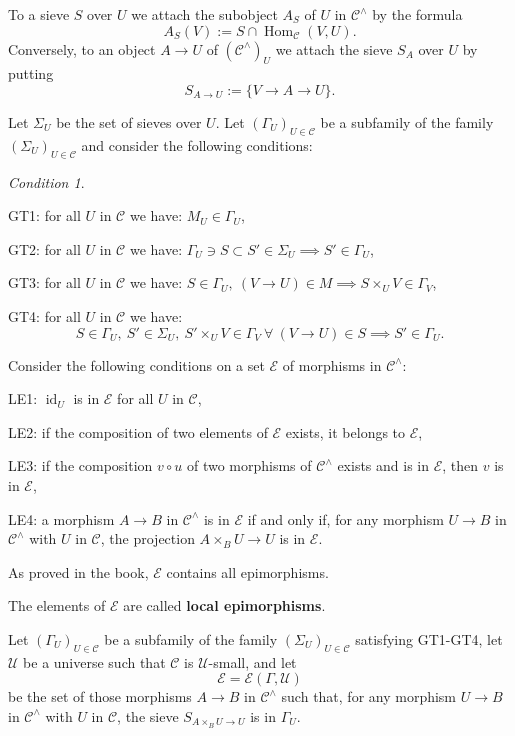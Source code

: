 \documentclass[12pt]{article}
\theoremstyle{remark}
\newtheorem{cond}[thm]{Condition}
\theoremstyle{definition}
\newcommand{\nn}{\noindent}
\newcommand{\cc}{\mathcal}
\newcommand{\C}{\mathcal C}
\newcommand{\U}{\mathcal U}
\DeclareMathOperator{\id}{id}
\DeclareMathOperator{\Hom}{Hom}
\begin{document}
To a sieve $S$ over $U$ we attach the subobject $A_S$ of $U$ in $\C^\wedge$ by the formula
$$
A_S(V):=S\cap\Hom_\C(V,U).
$$ 
Conversely, to an object $A\to U$ of $(\C^\wedge)_U$ we attach the sieve $S_A$ over $U$ by putting 
$$
S_{A\to U}:=\{V\to A\to U\}.
$$ 

Let $\Sigma_U$ be the set of sieves over $U$. Let $(\Gamma_U)_{U\in\C}$ be a subfamily of the family $(\Sigma_U)_{U\in\C}$ and consider the following conditions:

\begin{cond}\label{gt}
$\ $

\nn GT1: for all $U$ in $\C$ we have: $M_U\in\Gamma_U$,

\nn GT2: for all $U$ in $\C$ we have: $\Gamma_U\ni S\subset S'\in\Sigma_U\implies S'\in\Gamma_U$,

\nn GT3: for all $U$ in $\C$ we have: $S\in\Gamma_U,\ (V\to U)\in M\implies S\times_UV\in\Gamma_V$,

\nn GT4: for all $U$ in $\C$ we have: 
$$
S\in\Gamma_U,\ S'\in\Sigma_U,\ S'\times_UV\in\Gamma_V\ \forall\ (V\to U)\in S\implies S'\in\Gamma_U.
$$
\end{cond}

Consider the following conditions on a set $\cc E$ of morphisms in $\C^\wedge$:

\nn LE1: $\id_U$ is in $\cc E$ for all $U$ in $\C$,

\nn LE2: if the composition of two elements of $\cc E$ exists, it belongs to $\cc E$,

\nn LE3: if the composition $v\circ u$ of two morphisms of $\C^\wedge$ exists and is in $\cc E$, then $v$ is in $\cc E$,

\nn LE4: a morphism $A\to B$ in $\C^\wedge$ is in $\cc E$ if and only if, for any morphism $U\to B$ in $\C^\wedge$ with $U$ in $\C$, the projection $A\times_BU\to U$ is in $\cc E$.

As proved in the book, $\cc E$ contains all epimorphisms. 

The elements of $\cc E$ are called \textbf{local epimorphisms}.

Let $(\Gamma_U)_{U\in\C}$ be a subfamily of the family $(\Sigma_U)_{U\in\C}$ satisfying GT1\--GT4, let $\U$ be a universe such that $\C$ is $\U$-small, and let 
%
\begin{equation}\label{cce}
\cc E=\cc E(\Gamma,\U)
\end{equation}
%
be the set of those morphisms $A\to B$ in $\C^\wedge$ such that, for any morphism $U\to B$ in $\C^\wedge$ with $U$ in $\C$, the sieve $S_{A\times_BU\to U}$ is in $\Gamma_U$. 
\end{document}
